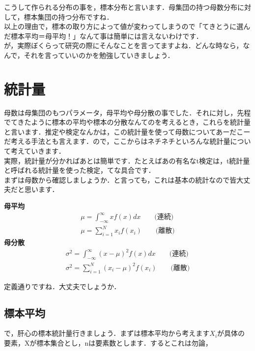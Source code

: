 \documentclass[11pt,a4paper]{ujreport} 	%
\begin{document}
こうして作られる分布の事を，標本分布と言います．母集団の持つ母数分布に対して，標本集団の持つ分布ですね．\\

以上の理由で，標本の取り方によって値が変わってしまうので「てきとうに選んだ標本平均＝母平均！」なんて事は簡単には言えないわけです．\\

が，実際ぼくらって研究の際にそんなことを言ってますよね．どんな時なら，なんで，それを言っていいのかを勉強していきましょう．
\section{統計量}
母数は母集団のもつパラメータ，母平均や母分散の事でした．それに対し，先程でてきたように標本の平均や標本の分散なんてのを考えるとき，これらを統計量と言います．推定や検定なんかは，この統計量を使って母数についてあーだこーだ考える手法とも言えます．ので，ここからはネチネチといろんな統計量について考えていきます．\\

実際，統計量が分かればあとは簡単です．たとえばあの有名なt検定は，t統計量と呼ばれる統計量を使った検定，てな具合です．\\

まずは母数から確認しましょうか．と言っても，これは基本の統計なので皆大丈夫だと思います．

\begin{screen}
  \textbf{母平均}
  \begin{align}
    \mu = \int_{-\infty}^{\infty} x f(x) dx \qquad \text{(連続)}\\
    \mu = \sum_{i=1}^N x_i f(x_i) \qquad \text{(離散)}
  \end{align}  
  \textbf{母分散}
  \begin{align}
    \sigma^2 = \int_{-\infty}^{\infty} (x-\mu)^2f(x)dx \qquad \text{(連続)}\\
    \sigma^2 = \sum_{i=1}^N (x_i-\mu)^2 f(x_i) \qquad \text{(離散)}
  \end{align}
\end{screen}

定義通りですね．大丈夫でしょうか．\\

\subsection{標本平均}
で，肝心の標本統計量行きましょう．まずは標本平均から考えます$X_i$が具体の要素，Xが標本集合とし，nは要素数とします．するとこれは勿論，
\end{document}
